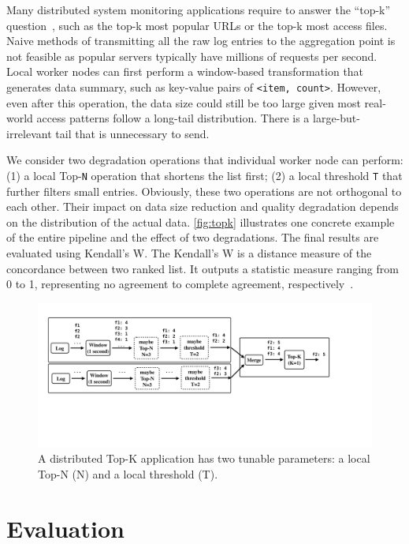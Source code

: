  Many distributed system monitoring applications
require to answer the ``top-k'' question~\cite{babcock2003distributed}, such as
the top-k most popular URLs or the top-k most access files. Naive methods of
transmitting all the raw log entries to the aggregation point is not feasible as
popular servers typically have millions of requests per second. Local worker
nodes can first perform a window-based transformation that generates data
summary, such as key-value pairs of \texttt{<item, count>}. However, even after
this operation, the data size could still be too large given most real-world
access patterns follow a long-tail distribution. There is a large-but-irrelevant
tail that is unnecessary to send.

We consider two degradation operations that individual worker node can perform:
(1) a local Top-\texttt{N} operation that shortens the list first; (2) a local
threshold \texttt{T} that further filters small entries. Obviously, these two
operations are not orthogonal to each other. Their impact on data size reduction
and quality degradation depends on the distribution of the actual
data. \autoref{fig:topk} illustrates one concrete example of the entire pipeline
and the effect of two degradations.  The final results are evaluated using
Kendall's W. The Kendall's W is a distance measure of the concordance between
two ranked list. It outputs a statistic measure ranging from 0 to 1,
representing no agreement to complete agreement,
respectively~\cite{abdi2007kendall}.

\begin{figure}
  \centering
  \includegraphics[width=\linewidth]{figures/topk.pdf}
  \caption{A distributed Top-K application has two tunable parameters: a local
    Top-N (N) and a local threshold (T).}
  \label{fig:topk}
\end{figure}

\section{Evaluation}
\label{sec:evaluation}

